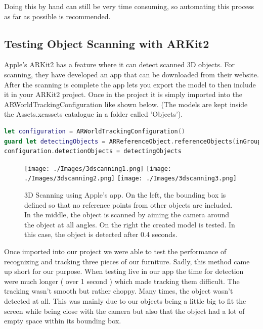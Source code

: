 Doing this by hand can still be very time consuming, so automating this process as far as possible is recommended.

\subsection{Testing Object Scanning with ARKit2}
Apple's ARKit2 has a feature where it can detect scanned 3D objects. For scanning, they have developed an app that can be downloaded from their website. \cite{ARScanning}
After the scanning is complete the app lets you export the model to then include it in your ARKit2 project. Once in the project it is simply imported into the ARWorldTrackingConfiguration like shown below. (The models are kept inside the Assets.xcassets catalogue in a folder called 'Objects').

\begin{lstlisting}[language=swift]
let configuration = ARWorldTrackingConfiguration()
guard let detectingObjects = ARReferenceObject.referenceObjects(inGroupNamed: "Objects", bundle: nil) else { return }
configuration.detectionObjects = detectingObjects
\end{lstlisting}

\begin{figure}[hbtp]
\begin{center}
\texttt{[image: ./Images/3dscanning1.png]}
\texttt{[image: ./Images/3dscanning2.png]}
\texttt{[image: ./Images/3dscanning3.png]} 
\caption{3D Scanning using Apple's app. On the left, the bounding box is defined so that no reference points from other objects are included. In the middle, the object is scanned by aiming the camera around the object at all angles. On the right the created model is tested. In this case, the object is detected after 0.4 seconds.}
\end{center}
\end{figure}

Once imported into our project we were able to test the performance of recognizing and tracking three pieces of our furniture.
Sadly, this method came up short for our purpose. When testing live in our app the time for detection were much longer ( over 1 second ) which made tracking them difficult. The tracking wasn't smooth but rather choppy. Many times, the object wasn't detected at all. This was mainly due to our objects being a little big to fit the screen while being close with the camera but also that the object had a lot of empty space within its bounding box.

